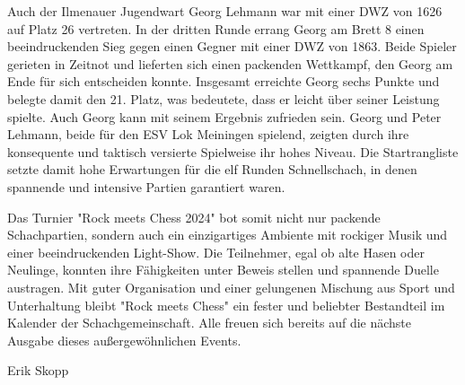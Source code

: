 \documentclass[a4paper,ngerman]{tui-algo-seminar}
\begin{document}
Auch der Ilmenauer Jugendwart Georg Lehmann war mit einer DWZ von 1626 auf Platz 26 vertreten. In der dritten Runde errang Georg am Brett 8 einen beeindruckenden Sieg gegen einen Gegner mit einer DWZ von 1863. Beide Spieler gerieten in Zeitnot und lieferten sich einen packenden Wettkampf, den Georg am Ende für sich entscheiden konnte. Insgesamt erreichte Georg sechs Punkte und belegte damit den 21. Platz, was bedeutete, dass er leicht über seiner Leistung spielte. Auch Georg kann mit seinem Ergebnis zufrieden sein. Georg und Peter Lehmann, beide für den ESV Lok Meiningen spielend, zeigten durch ihre konsequente und taktisch versierte Spielweise ihr hohes Niveau. Die Startrangliste setzte damit hohe Erwartungen für die elf Runden Schnellschach, in denen spannende und intensive Partien garantiert waren.

Das Turnier "Rock meets Chess 2024" bot somit nicht nur packende Schachpartien, sondern auch ein einzigartiges Ambiente mit rockiger Musik und einer beeindruckenden Light-Show. Die Teilnehmer, egal ob alte Hasen oder Neulinge, konnten ihre Fähigkeiten unter Beweis stellen und spannende Duelle austragen. Mit guter Organisation und einer gelungenen Mischung aus Sport und Unterhaltung bleibt "Rock meets Chess" ein fester und beliebter Bestandteil im Kalender der Schachgemeinschaft. Alle freuen sich bereits auf die nächste Ausgabe dieses außergewöhnlichen Events.

Erik Skopp
\end{document}
